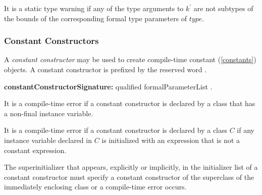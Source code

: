 \documentclass{article}
\begin{document}

\LMHash{}
It is a static type warning if any of the type arguments to $k^\prime$ are not subtypes of the bounds of the corresponding formal type parameters of $type$.


\subsubsection{Constant Constructors}

\LMHash{}
A {\em constant constructor} may be used to create compile-time constant (\ref{constants}) objects.
A constant constructor is prefixed by the reserved word \CONST{}.

\begin{grammar}
{\bf constantConstructorSignature:}\CONST{} qualified formalParameterList
  .
\end{grammar}



\LMHash{}
It is a compile-time error if a constant constructor is declared by a class that has a non-final instance variable.


\LMHash{}
It is a compile-time error if a constant constructor is declared by a class $C$ if any instance variable declared in $C$ is initialized with an expression that is not a constant expression.


\LMHash{}
The superinitializer that appears, explicitly or implicitly, in the initializer list of a constant constructor must specify a constant constructor of the superclass of the immediately enclosing class or a compile-time error occurs.
\end{document}
